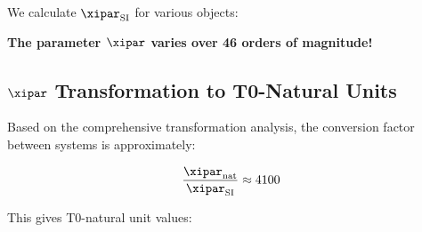 	We calculate $\xipar_{\text{SI}}$ for various objects:
	
	\begin{table}[htbp]
		\centering
		\caption{$\xipar$ values for different objects in SI units}
		\label{tab:xi_si_values}
	\end{table}
	
	\textbf{The parameter $\xipar$ varies over 46 orders of magnitude!}
	
	\subsection{$\xipar$ Transformation to T0-Natural Units}
	\label{subsec:xi_transformation}
	
	Based on the comprehensive transformation analysis, the conversion factor between systems is approximately:
	
	$$\frac{\xipar_{\text{nat}}}{\xipar_{\text{SI}}} \approx 4100$$
	
	This gives T0-natural unit values:
	
	\begin{table}[htbp]
		\centering
		\caption{$\xipar$ transformation between unit systems}
		\label{tab:xi_transformation}
	\end{table}
	
